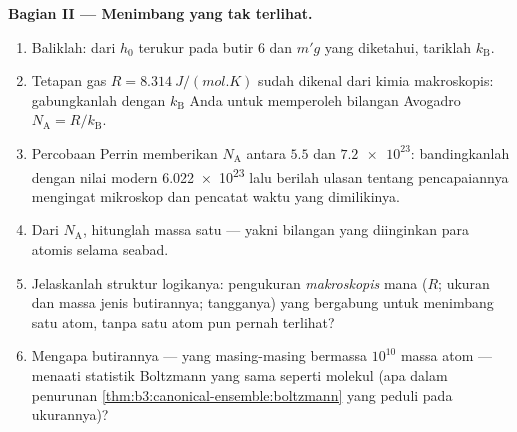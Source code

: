 \begin{problem}
\medskip\noindent\textbf{Bagian II --- Menimbang yang tak terlihat.}
\begin{enumerate}[resume]
  \item Baliklah: dari $h_0$ terukur pada butir 6 dan $m'g$ yang
        diketahui, tariklah $k_{\text{B}}$.
  \item Tetapan gas $R = \qty{8.314}{J/(mol.K)}$ sudah dikenal dari
        kimia makroskopis: gabungkanlah dengan $k_{\text{B}}$ Anda untuk
        memperoleh bilangan Avogadro $N_{\text{A}} =
        R/k_{\text{B}}$.
  \item Percobaan Perrin memberikan $N_{\text{A}}$ antara $5.5$ dan
        $\num{7.2e23}$: bandingkanlah dengan nilai modern
        \num{6.022e23} lalu berilah ulasan tentang pencapaiannya
        mengingat mikroskop dan pencatat waktu yang dimilikinya.
  \item Dari $N_{\text{A}}$, hitunglah massa satu  ---
        yakni bilangan yang diinginkan para atomis selama seabad.
  \item Jelaskanlah struktur logikanya: pengukuran \emph{makroskopis}
        mana ($R$; ukuran dan massa jenis butirannya; tangganya) yang
        bergabung untuk menimbang satu atom, tanpa satu atom pun pernah
        terlihat?
  \item Mengapa butirannya --- yang masing-masing bermassa $10^{10}$
        massa atom --- menaati statistik Boltzmann yang sama seperti
        molekul (apa dalam penurunan
        \cref{thm:b3:canonical-ensemble:boltzmann} yang peduli pada
        ukurannya)?
\end{enumerate}


\end{problem}
